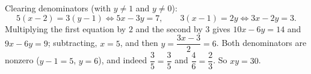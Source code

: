 Clearing denominators (with $y\ne1$ and $y\ne0$):
\[5(x-2)=3(y-1)\iff5x-3y=7,\qquad3(x-1)=2y\iff3x-2y=3.\]
Multiplying the first equation by $2$ and the second by $3$ gives $10x-6y=14$ and $9x-6y=9$; subtracting, $x=5$, and then $y=\dfrac{3x-3}{2}=6$. Both denominators are nonzero ($y-1=5$, $y=6$), and indeed $\dfrac{3}{5}=\dfrac35$ and $\dfrac46=\dfrac23$. So $xy=\boxed{30}$.
